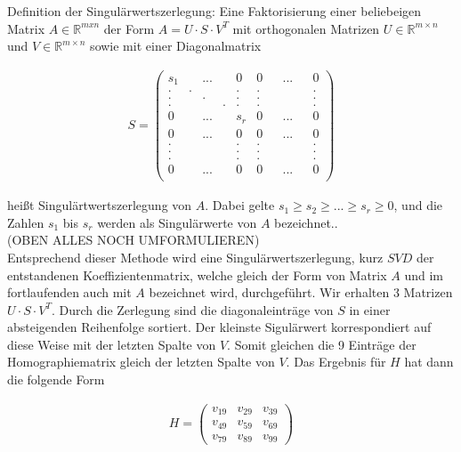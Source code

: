 Definition der Singulärwertszerlegung: Eine Faktorisierung einer beliebeigen Matrix \ensuremath{A \in \mathbb{R}^{mxn}} der Form \ensuremath{A = U \cdot S \cdot V^T} mit orthogonalen Matrizen \ensuremath{U \in \mathbb{R}^{m \times n}} und \ensuremath{V \in \mathbb{R}^{m \times n}} sowie mit einer Diagonalmatrix 

\begin{gather}
	S = \begin{pmatrix}
	s_1&&...&&0&0&&...&&0\\
	.&.&&&.&.&&&&.\\
	.&&.&&.&.&&&&.\\
	.&&&.&.&.&&&&.\\
	0&&...&&s_r&0&&...&&0\\	
	0&&...&&0&0&&...&&0\\
	.&&&&.&.&&&&.\\
	.&&&&.&.&&&&.\\	
	.&&&&.&.&&&&.\\	
	0&&...&&0&0&&...&&0\\	
	\end{pmatrix}
\end{gather}

heißt Singulärtwertszerlegung von $A$. Dabei gelte \ensuremath{s_1 \geq s_2 \geq ... \geq s_r \ge 0 }, und die Zahlen $s_1$ bis $s_r$ werden als Singulärwerte von $A$ bezeichnet.\cite{Scholz}.\\

(OBEN ALLES NOCH UMFORMULIEREN) \\


Entsprechend dieser Methode wird eine Singulärwertszerlegung, kurz $SVD$ der entstandenen Koeffizientenmatrix, welche gleich der Form von Matrix $A$ und im fortlaufenden auch mit $A$ bezeichnet wird, durchgeführt. Wir erhalten 3 Matrizen $U \cdot S\cdot V^T$. Durch die Zerlegung sind die diagonaleinträge von $S$ in einer absteigenden Reihenfolge sortiert. Der kleinste Sigulärwert korrespondiert auf diese Weise mit der letzten Spalte von $V$. Somit gleichen die 9 Einträge der Homographiematrix gleich der letzten Spalte von $V$. Das Ergebnis für $H$ hat dann die folgende Form

\begin{gather}
	H=
	\begin{pmatrix}
	v_{19}&v_{29}&v_{39}\\
	v_{49}&v_{59}&v_{69}\\
	v_{79}&v_{89}&v_{99}
	\end{pmatrix}
\end{gather}

